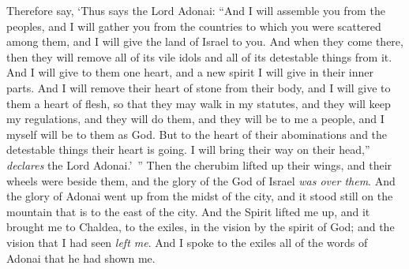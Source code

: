 \begin{biblechapter}
\verse Therefore say, ‘Thus says the Lord Adonai: “And I will assemble you from the peoples, and I will gather you from the countries to which you were scattered among them, and I will give the land of Israel to you.
\verse And when they come there, then they will remove all of its vile idols and all of its detestable things from it.
\verse And I will give to them one heart, and a new spirit I will give in their inner parts. And I will remove their heart of stone from their body, and I will give to them a heart of flesh,
\verse so that they may walk in my statutes, and they will keep my regulations, and they will do them, and they will be to me a people, and I myself will be to them as God.
\verse But to the heart of their abominations and the detestable things their heart is going. I will bring their way on their head,” \textit{declares} the Lord Adonai.’ ”
\verse Then the cherubim lifted up their wings, and their wheels were beside them, and the glory of the God of Israel \textit{was over them}.
\verse And the glory of Adonai went up from the midst of the city, and it stood still on the mountain that is to the east of the city.
\verse And the Spirit lifted me up, and it brought me to Chaldea, to the exiles, in the vision by the spirit of God; and the vision that I had seen \textit{left me}.
\verse And I spoke to the exiles all of the words of Adonai that he had shown me.
\end{biblechapter}

